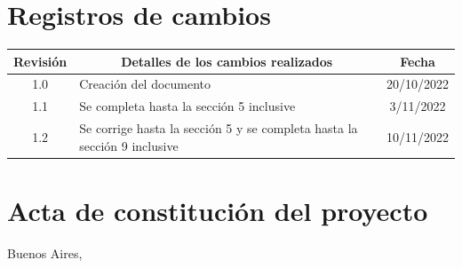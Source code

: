 \documentclass[
11pt, %
]{charter}
\begin{document}
\maketitle
\thispagestyle{empty}
\pagebreak


\thispagestyle{empty}
{\setlength{\parskip}{0pt}
\tableofcontents{}
}
\pagebreak


\section*{Registros de cambios}
\label{sec:registro}


\begin{table}[ht]
\label{tab:registro}
\centering
\begin{tabularx}{\linewidth}{@{}|c|X|c|@{}}
\hline
\rowcolor[HTML]{C0C0C0} 
Revisión & \multicolumn{1}{c|}{\cellcolor[HTML]{C0C0C0}Detalles de los cambios realizados} & Fecha      \\ \hline
1.0		& Creación del documento												& 20/10/2022 \\ \hline
1.1		& Se completa hasta la sección 5 inclusive							& 3/11/2022 \\ \hline
1.2		& Se corrige hasta la sección 5 y se completa hasta la sección 9 inclusive							& 10/11/2022 \\ \hline
\end{tabularx}
\end{table}

\pagebreak



\section*{Acta de constitución del proyecto}
\label{sec:acta}

\begin{flushright}
Buenos Aires, \fechaInicioName
\end{flushright}
\end{document}
